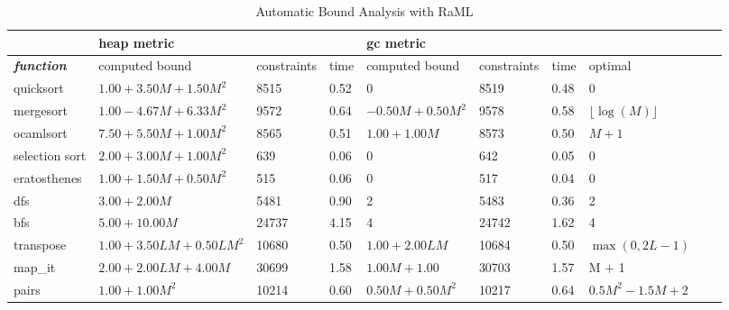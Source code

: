 \documentclass{easychair}
\newcounter{rule}
\theoremstyle{definition}
\begin{document}
\begin{table}[]
	\begin{adjustbox}{width=1\textwidth, center=\textwidth}
  \begin{tabular}{@{}llllllllll@{}}
		\toprule
		 & \multicolumn{3}{l}{heap metric} & \multicolumn{3}{l}{gc metric} &  \\ \midrule
		 \textit{\textbf{function}} & computed bound & constraints & time & computed bound &  constraints & time & optimal \\
		 quicksort & $1.00 + 3.50M + 1.50M^2$ & 8515 & 0.52 & 0 & 8519 & 0.48 & 0 \\
		 mergesort & $1.00 - 4.67M + 6.33M^2$ & 9572 & 0.64 & $-0.50M + 0.50M^2$ & 9578 & 0.58 & $\lfloor \log(M) \rfloor$ \\
		 ocamlsort & $7.50 + 5.50M + 1.00M^2$ & 8565 & 0.51 & $1.00 + 1.00M$ & 8573 & 0.50 & $M+1$ \\
		 selection sort & $2.00 + 3.00M + 1.00M^2$ & 639 & 0.06 & 0 & 642 & 0.05 & 0 \\
		 eratosthenes & $1.00 + 1.50M + 0.50M^2$ & 515 & 0.06 & 0 & 517 & 0.04 & 0 \\
		 dfs & $3.00 + 2.00M$ & 5481 & 0.90 & 2 & 5483 & 0.36 & 2 \\
		 bfs & $5.00 + 10.00M$ & 24737 & 4.15 & 4 & 24742 & 1.62 & 4 \\
		 transpose & $1.00 + 3.50LM + 0.50LM^2$ & 10680 & 0.50 & $1.00 + 2.00LM$ & 10684 & 0.50 & $\max{(0,2L-1)}$ \\
		 map\_it & $2.00 + 2.00LM + 4.00M$ & 30699 & 1.58 & $1.00M + 1.00$ & 30703 & 1.57 & M + 1 \\
		 pairs & $1.00 + 1.00M^2$ & 10214 & 0.60 & $0.50M + 0.50M^2$ & 10217 & 0.64 & $0.5M^2-1.5M+2$ \\ \midrule
	\end{tabular}
	\end{adjustbox}
	\caption{Automatic Bound Analysis with RaML}
\label{table:bounds}
\end{table}
\end{document}
